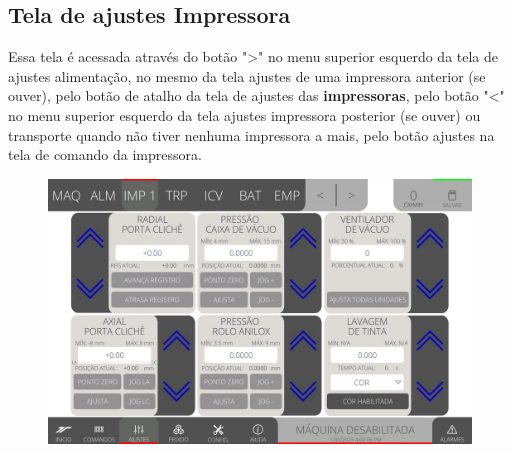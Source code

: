 \thispagestyle{fancy}
\vspace*{40 pt}
\subsection{Tela de ajustes Impressora} \label{sec:telaAjustesImpressora}
Essa tela é acessada através do botão "\textgreater" no menu superior esquerdo da tela de ajustes alimentação, no mesmo da tela ajustes de uma impressora anterior (se ouver),
 pelo botão de atalho da tela de ajustes das \textbf{impressoras}, pelo botão "\textless{}" no menu superior esquerdo da tela ajustes impressora posterior (se ouver) ou transporte 
 quando não tiver nenhuma impressora a mais, pelo botão ajustes na tela de comando da impressora.
\vspace*{\fill}
\begin{figure}[h]
    \centering
    \includegraphics[width=480 px,height=300 px]{src/imagesICV/04-printters/02-printter/settings/e-Tela-Principal.png}
\end{figure}
\vspace*{\fill}

\newpage
\thispagestyle{fancy}
\vspace*{40 pt}
